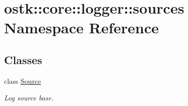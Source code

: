 \hypertarget{namespaceostk_1_1core_1_1logger_1_1sources}{}\section{ostk\+:\+:core\+:\+:logger\+:\+:sources Namespace Reference}
\label{namespaceostk_1_1core_1_1logger_1_1sources}
\subsection*{Classes}
\begin{DoxyCompactItemize}
\item 
class \hyperlink{classostk_1_1core_1_1logger_1_1sources_1_1_source}{Source}
\begin{DoxyCompactList}\small\item\em Log source base. \end{DoxyCompactList}\end{DoxyCompactItemize}
